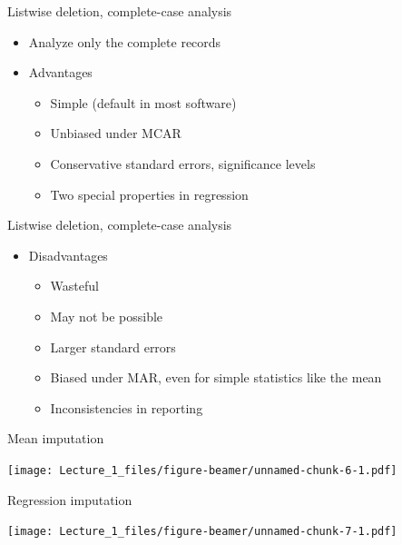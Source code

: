 \documentclass[ignorenonframetext,aspectratio=43]{beamer}
\providecommand{\tightlist}{%
  \setlength{\itemsep}{0pt}\setlength{\parskip}{0pt}}
\begin{document}
\begin{frame}{Listwise deletion, complete-case analysis}
\protect\hypertarget{listwise-deletion-complete-case-analysis}{}

\begin{itemize}
\tightlist
\item
  Analyze only the complete records
\item
  Advantages

  \begin{itemize}
  \tightlist
  \item
    Simple (default in most software)
  \item
    Unbiased under MCAR
  \item
    Conservative standard errors, significance levels
  \item
    Two special properties in regression
  \end{itemize}
\end{itemize}

\end{frame}

\begin{frame}{Listwise deletion, complete-case analysis}
\protect\hypertarget{listwise-deletion-complete-case-analysis-1}{}

\begin{itemize}
\tightlist
\item
  Disadvantages

  \begin{itemize}
  \tightlist
  \item
    Wasteful
  \item
    May not be possible
  \item
    Larger standard errors
  \item
    Biased under MAR, even for simple statistics like the mean
  \item
    Inconsistencies in reporting
  \end{itemize}
\end{itemize}

\end{frame}

\begin{frame}{Mean imputation}
\protect\hypertarget{mean-imputation}{}

\texttt{[image: Lecture\_1\_files/figure-beamer/unnamed-chunk-6-1.pdf]}

\end{frame}

\begin{frame}{Regression imputation}
\protect\hypertarget{regression-imputation}{}

\texttt{[image: Lecture\_1\_files/figure-beamer/unnamed-chunk-7-1.pdf]}

\end{frame}
\end{document}
